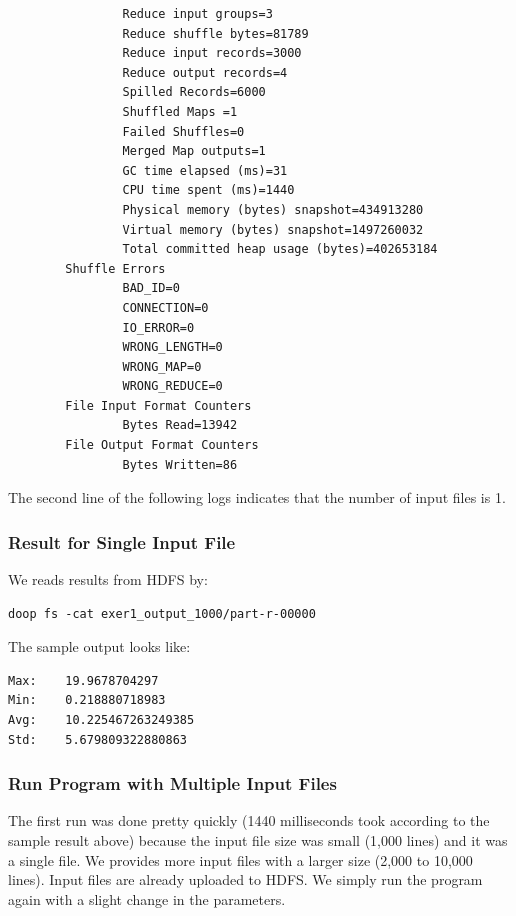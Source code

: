 \begin{lstlisting}
                Reduce input groups=3
                Reduce shuffle bytes=81789
                Reduce input records=3000
                Reduce output records=4
                Spilled Records=6000
                Shuffled Maps =1
                Failed Shuffles=0
                Merged Map outputs=1
                GC time elapsed (ms)=31
                CPU time spent (ms)=1440
                Physical memory (bytes) snapshot=434913280
                Virtual memory (bytes) snapshot=1497260032
                Total committed heap usage (bytes)=402653184
        Shuffle Errors
                BAD_ID=0
                CONNECTION=0
                IO_ERROR=0
                WRONG_LENGTH=0
                WRONG_MAP=0
                WRONG_REDUCE=0
        File Input Format Counters
                Bytes Read=13942
        File Output Format Counters
                Bytes Written=86

\end{lstlisting}

The second line of the following logs indicates that the number of
input files is 1.

\subsubsection{Result for Single Input File}

We reads results from HDFS by:

\begin{lstlisting}
doop fs -cat exer1_output_1000/part-r-00000
\end{lstlisting}

The sample output looks like:

\begin{lstlisting}
Max:    19.9678704297
Min:    0.218880718983
Avg:    10.225467263249385
Std:    5.679809322880863
\end{lstlisting}

\subsubsection{Run Program with Multiple Input Files}

The first run was done pretty quickly (1440 milliseconds took
according to the sample result above) because the input file size was
small (1,000 lines) and it was a single file. We provides more input
files with a larger size (2,000 to 10,000 lines). Input files are
already uploaded to HDFS. We simply run the program again with a
slight change in the parameters.

